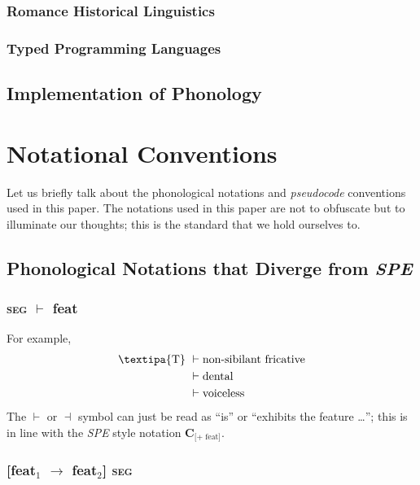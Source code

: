 \documentclass{report}[12pt]
\begin{document}
\subsection*{Romance Historical Linguistics}

\subsection*{Typed Programming Languages}

\section*{Implementation of Phonology}

\chapter*{Notational Conventions}

Let us briefly talk about the phonological notations and \emph{pseudocode} conventions used in this paper. The notations used in this paper are not to obfuscate but to illuminate our thoughts; this is the standard that we hold ourselves to.

\section*{Phonological Notations that Diverge from \emph{SPE}}

\subsection*{\textsc{seg} $\vdash$ feat}

For example,
\begin{align*}
  \text{\textipa{T}}\ & \vdash \text{non-sibilant fricative} \\
                     & \vdash \text{dental} \\
                     & \vdash \text{voiceless} 
\end{align*}
The $\vdash$ or $\dashv$ symbol can just be read as ``is'' or ``exhibits the feature \dots''; this is in line with the \emph{SPE} style \cite{spe} notation $\textbf{C}_{\text{[+\ feat]}}$.

\subsection*{[feat$_1$ $\rightarrow$ feat$_2$] \textsc{seg}}
\end{document}

